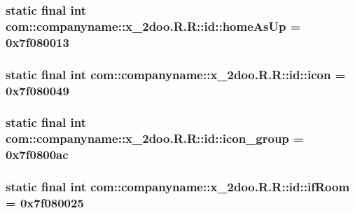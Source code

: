 \hypertarget{classcom_1_1companyname_1_1x__2doo_1_1_r_1_1id_263b9b70414e1cb64939da47886273e1}{
\subsubsection[{homeAsUp}]{\setlength{\rightskip}{0pt plus 5cm}static final int com::companyname::x\_\-2doo.R.R::id::homeAsUp = 0x7f080013}}
\label{classcom_1_1companyname_1_1x__2doo_1_1_r_1_1id_263b9b70414e1cb64939da47886273e1}


\hypertarget{classcom_1_1companyname_1_1x__2doo_1_1_r_1_1id_46ec91625cd92403be174683776369e9}{
\subsubsection[{icon}]{\setlength{\rightskip}{0pt plus 5cm}static final int com::companyname::x\_\-2doo.R.R::id::icon = 0x7f080049}}
\label{classcom_1_1companyname_1_1x__2doo_1_1_r_1_1id_46ec91625cd92403be174683776369e9}


\hypertarget{classcom_1_1companyname_1_1x__2doo_1_1_r_1_1id_8d1e123f6de76ef19065d35b87fc6795}{
\subsubsection[{icon\_\-group}]{\setlength{\rightskip}{0pt plus 5cm}static final int com::companyname::x\_\-2doo.R.R::id::icon\_\-group = 0x7f0800ac}}
\label{classcom_1_1companyname_1_1x__2doo_1_1_r_1_1id_8d1e123f6de76ef19065d35b87fc6795}


\hypertarget{classcom_1_1companyname_1_1x__2doo_1_1_r_1_1id_eca1513ce4e21feb299b7b39a2489ddf}{
\subsubsection[{ifRoom}]{\setlength{\rightskip}{0pt plus 5cm}static final int com::companyname::x\_\-2doo.R.R::id::ifRoom = 0x7f080025}}
\label{classcom_1_1companyname_1_1x__2doo_1_1_r_1_1id_eca1513ce4e21feb299b7b39a2489ddf}


